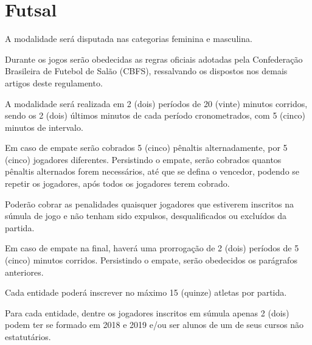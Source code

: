 {\let\clearpage\relax \chapter{Futsal}}

\begin{article}
	A modalidade será disputada nas categorias feminina e masculina.
\end{article}

\begin{article}
	Durante os jogos serão obedecidas as regras oficiais adotadas pela Confederação Brasileira de Futebol de Salão (CBFS), ressalvando os dispostos nos demais artigos deste regulamento.
\end{article}

\begin{article}
	A modalidade será realizada em 2 (dois) períodos de 20 (vinte) minutos corridos, sendo os 2 (dois) últimos minutos de cada período cronometrados, com 5 (cinco) minutos de intervalo.

	\begin{xparagraph}
		Em caso de empate serão cobrados 5 (cinco) pênaltis alternadamente, por 5 (cinco) jogadores diferentes. Persistindo o empate, serão cobrados quantos pênaltis alternados forem necessários, até que se defina o vencedor, podendo se repetir os jogadores, após todos os jogadores terem cobrado.
	\end{xparagraph}

	\begin{xparagraph}
		Poderão cobrar as penalidades quaisquer jogadores que estiverem inscritos na súmula de jogo e não tenham sido expulsos, desqualificados ou excluídos da partida.
	\end{xparagraph}

	\begin{xparagraph}
		Em caso de empate na final, haverá uma prorrogação de 2 (dois) períodos de 5 (cinco) minutos corridos. Persistindo o empate, serão obedecidos os parágrafos anteriores.
	\end{xparagraph}
\end{article}

\begin{article}
	Cada entidade poderá inscrever no máximo 15 (quinze) atletas por partida.
\end{article}

\begin{article}
	Para cada entidade, dentre os jogadores inscritos em súmula apenas 2 (dois) podem ter se formado em 2018 e 2019 e/ou ser alunos de um de seus cursos não estatutários.
\end{article}
